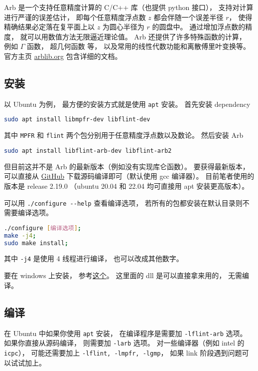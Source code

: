 

Arb 是一个支持任意精度计算的 C/C++ 库（也提供 python 接口）， 支持对计算进行严谨的误差估计， 即每个任意精度浮点数 $z$ 都会伴随一个误差半径 $r$， 使得精确结果必定落在复平面上以 $z$ 为圆心半径为 $r$ 的圆盘中。 通过增加浮点数的精度， 就可以用数值方法无限逼近理论值。 Arb 还提供了许多特殊函数的计算， 例如 $\Gamma$ 函数， 超几何函数 等， 以及常用的线性代数功能和离散傅里叶变换等。 官方主页 \href{https://arblib.org/}{arblib.org} 包含详细的文档。

\subsection{安装}
以 Ubuntu 为例， 最方便的安装方式就是使用 \verb|apt| 安装。 首先安装 dependency
\begin{lstlisting}[language=bash]
sudo apt install libmpfr-dev libflint-dev
\end{lstlisting}
其中 \verb|MPFR| 和 \verb|flint| 两个包分别用于任意精度浮点数以及数论。 然后安装 Arb
\begin{lstlisting}[language=bash]
sudo apt install libflint-arb-dev libflint-arb2
\end{lstlisting}

但目前这并不是 Arb 的最新版本（例如没有实现库仑函数）。 要获得最新版本， 可以直接从 \href{https://github.com/fredrik-johansson/arb/}{GitHub} 下载源码编译即可（默认使用 gcc 编译器）。 目前笔者使用的版本是 release 2.19.0 （ubuntu 20.04 和 22.04 均可直接用 apt 安装更高版本）。

可以用 \verb|./configure --help| 查看编译选项， 若所有的包都安装在默认目录则不需要编译选项。
\begin{lstlisting}[language=bash]
./configure [编译选项];
make -j4;
sudo make install;
\end{lstlisting}
其中 \verb|-j4| 是使用 4 线程进行编译， 也可以改成其他数字。

要在 windows 上安装， 参考\href{https://github.com/ahrvoje/arb4win}{这个}。 这里面的 dll 是可以直接拿来用的， 无需编译。

\subsection{编译}
在 Ubuntu 中如果你使用 \verb|apt| 安装， 在编译程序是需要加 \verb|-lflint-arb| 选项。 如果你直接从源码编译， 则需要加 \verb|-larb| 选项。 对一些编译器（例如 intel 的 \verb|icpc|）， 可能还需要加上 \verb|-lflint, -lmpfr, -lgmp|， 如果 link 阶段遇到问题可以试试加上。

